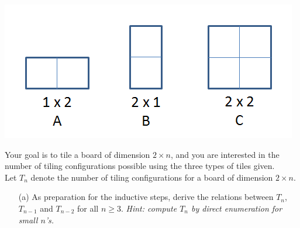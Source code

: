 \documentclass[11pt]{article}
\newif\ifsolutions
\renewcommand{\answer}[1]{{\color{mydarkblue}\textbf{Solutions: }#1}}
\begin{document}
\begin{qunlist}
\begin{minipage}{\linewidth}
\centering
\includegraphics[scale=0.6]{resources/figures/tile.png}
\end{minipage}

Your goal is to tile a board of dimension $2 \times n$, and you are interested in the number of
tiling configurations possible using the three types of tiles given. \\
Let $T_n$ denote the number of tiling configurations for a board of dimension $2 \times n$.
\begin{itemize}
\item[(a)] As preparation for the inductive steps, derive the relations between $T_n$, $T_{n-1}$ 
and $T_{n-2}$ for all $n \geq 3$. \textit{Hint: compute $T_n$ by direct enumeration for small $n$'s.}

\ifsolutions
\answer{
\[ T_n = T_{n-1} + 2T_{n-2}, \quad \text{for all } n \geq 3 \]
We enumerate the tilings for a $2 \times n$ board by considering three cases depending on
the type of tile covering the bottom square of the first column. 
\begin{itemize}
\item[(i)] The tile is of type \textbf{A}: 
then the first two columns of the board must be tiled with \textbf{AA}.
The remaining $2 \times (n-2)$ board can be tiled in $T_{n-2}$ ways.
\item[(ii)] The tile is of type \textbf{B}: the first column is tiled with \textbf{B}, and
the remaining $2 \times (n-1)$ board can be tiled in $T_{n-1}$ ways.
\item[(iii)] The tile is of type \textbf{C}: the first two columns of the board are tiled with \textbf{C}, 
and the remaining $2 \times (n-2)$ board can be tiled in $T_{n-2}$ ways.
\end{itemize}
Note that the three cases are exhaustive and mutually exclusive. The number of tilings for a $2 \times n$
board therefore satisfies the recurrence relation as proposed.
}
\fi



\end{itemize}
\end{qunlist}
\end{document}

